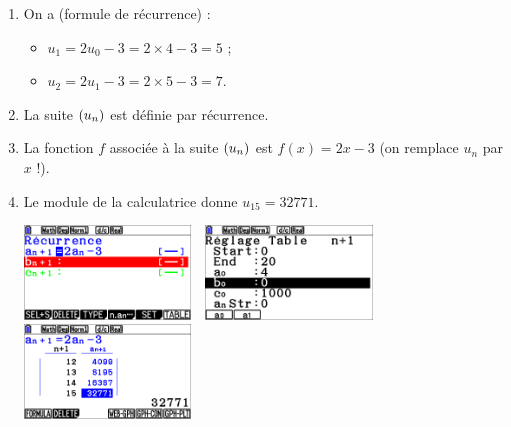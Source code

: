 \documentclass[a4paper,11pt]{article}
\begin{document}
\begin{enumerate}[itemsep=0pt]
	\item On a (formule de récurrence) :
	\begin{itemize}
		\item $u_1=2u_0-3=2 \times 4 -3 = 5$ ;
		\item $u_2=2u_1-3=2 \times 5 - 3=7$.
	\end{itemize}
	\item La suite $\left( u_n \right)$ est définie par récurrence.
	\item La fonction $f$ associée à la suite $\left( u_n \right)$ est $f(x)=2x-3$ (on remplace $u_n$ par $x$ !).
	\item Le module  de la calculatrice donne $u_{15}=\num{32771}$.
	\begin{center}
		\includegraphics[height=2.5cm]{chap02_exos_corr_3a}~~\includegraphics[height=2.5cm]{chap02_exos_corr_3b}~~\includegraphics[height=2.5cm]{chap02_exos_corr_3c}
	\end{center}
\end{enumerate}

\medskip

\end{document}
